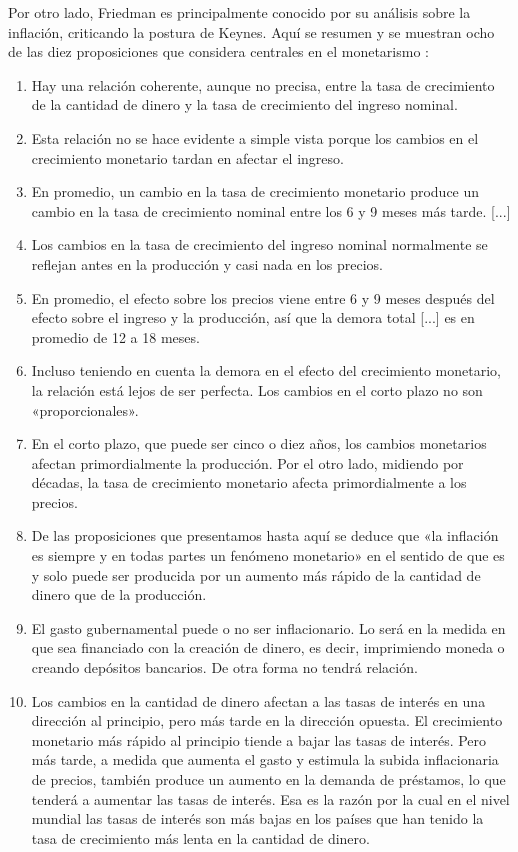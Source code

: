 \documentclass[12pt,a4paper,twoside]{book}
\begin{document}
Por otro lado, Friedman es principalmente conocido por su análisis sobre la inflación, criticando la postura de Keynes. Aquí se resumen y se muestran ocho de las diez proposiciones que considera centrales en el monetarismo \cite[págs. 36-37]{friedman:paro}:

\begin{enumerate}
\item Hay una relación coherente, aunque no precisa, entre la tasa de crecimiento de la cantidad de dinero y la tasa de crecimiento del ingreso nominal.
\item Esta relación no se hace evidente a simple vista porque los cambios en el crecimiento monetario tardan en afectar el ingreso.
\item En promedio, un cambio en la tasa de crecimiento monetario produce un cambio en la tasa de crecimiento nominal entre los 6 y 9 meses más tarde. [...]
\item Los cambios en la tasa de crecimiento del ingreso nominal normalmente se reflejan antes en la producción y casi nada en los precios.
\item En promedio, el efecto sobre los precios viene entre 6 y 9 meses después del efecto sobre el ingreso y la producción, así que la demora total [...] es en promedio de 12 a 18 meses. 
\item Incluso teniendo en cuenta la demora en el efecto del crecimiento monetario, la relación está lejos de ser perfecta. Los cambios en el corto plazo no son «proporcionales».
\item En el corto plazo, que puede ser cinco o diez años, los cambios monetarios afectan primordialmente la producción. Por el otro lado, midiendo por décadas, la tasa de crecimiento monetario afecta primordialmente a los precios.
\item De las proposiciones que presentamos hasta aquí se deduce que «la inflación es siempre y en todas partes un fenómeno monetario» en el sentido de que es y solo puede ser producida por un aumento más rápido de la cantidad de dinero que de la producción.
\item El gasto gubernamental puede o no ser inflacionario. Lo será en la medida en que sea financiado con la creación de dinero, es decir, imprimiendo moneda o creando depósitos bancarios. De otra forma no tendrá relación.
\item Los cambios en la cantidad de dinero afectan a las tasas de interés en una dirección al principio, pero más tarde en la dirección opuesta. El crecimiento monetario más rápido al principio tiende a bajar las tasas de interés. Pero más tarde, a medida que aumenta el gasto y estimula la subida inflacionaria de precios, también produce un aumento en la demanda de préstamos, lo que tenderá a aumentar las tasas de interés. Esa es la razón por la cual en el nivel mundial las tasas de interés son más bajas en los países que han tenido la tasa de crecimiento más lenta en la cantidad de dinero. \cite[pág. 37-38]{friedman:paro}
\end{enumerate}
\end{document}
